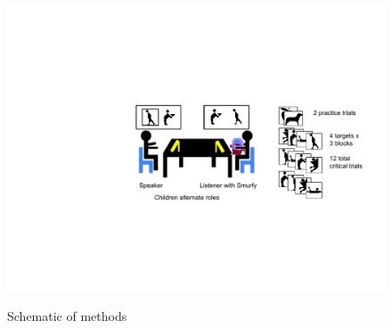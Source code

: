 \documentclass[11pt,a4paper]{article}
\begin{document}
\begin{figure}
	\caption{Schematic of methods}
 \begin{center}{ \includegraphics[width=.8\textwidth, trim={8cm 6cm 1cm 6.4cm}, clip]{exp-diagram.pdf}}
 	\end{center}
\end{figure}
\end{document}
